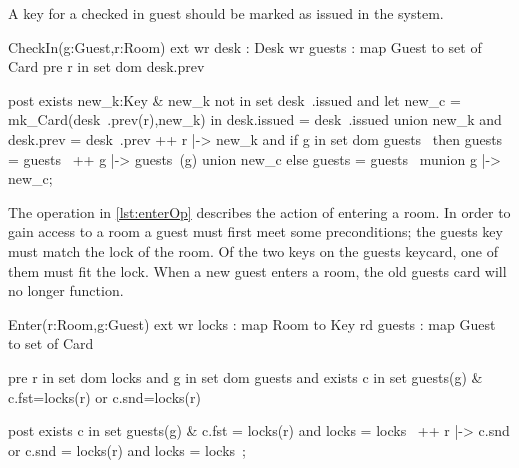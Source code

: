 \documentclass[Main]{subfiles}
\begin{document}
A key for a checked in guest should be marked as issued in the system.

\begin{vdmsl}[label=lst:checkinOp,caption=CheckIn operation]
CheckIn(g:Guest,r:Room)
ext wr desk   : Desk
    wr guests : map Guest to set of Card
pre r in set dom desk.prev

post exists new_k:Key &
  new_k not in set desk~.issued and
  let new_c = mk_Card(desk~.prev(r),new_k)
    in
      desk.issued = desk~.issued union {new_k} and
	    desk.prev = desk~.prev ++ {r |-> new_k} and
	    if g in set dom guests~
	      then guests = guests~ ++ {g |-> guests~(g) union {new_c}}
      else
        guests = guests~ munion {g |-> {new_c}};
\end{vdmsl}
The  operation in \codeTitle \ref{lst:enterOp} describes the action of entering a room.
In order to gain access to a room a guest must first meet some preconditions; the guests key must match the lock of the room.
Of the two keys on the guests keycard, one of them must fit the lock.
When a new guest enters a room, the old guests card will no longer function.
\newpage

\begin{vdmsl}[label=lst:enterOp,caption=Enter operation]
Enter(r:Room,g:Guest)
ext wr locks  : map Room to Key
    rd guests : map Guest to set of Card

pre r in set dom locks and
  g in set dom guests and
  exists c in set guests(g) & c.fst=locks(r) or c.snd=locks(r)

post exists c in set guests(g) &
	c.fst = locks(r) and locks = locks~ ++ {r |-> c.snd} or
	c.snd = locks(r) and locks = locks~;
\end{vdmsl}
\end{document}
